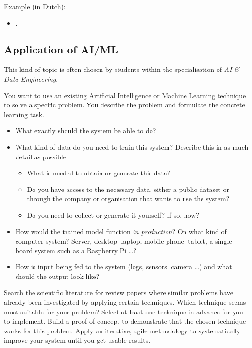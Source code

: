Example (in Dutch):

\begin{itemize}
	\item {} \autocite{Vermeersch2024}.
\end{itemize}

\subsection{Application of AI/ML}%
\label{ssec:thesis_type_application_of_AI_ML}

This kind of topic is often chosen by students within the specialisation of \emph{AI \& Data Engineering}.

You want to use an existing Artificial Intelligence or Machine Learning technique to solve a specific problem. You describe the problem and formulate the concrete learning task. 
\begin{itemize}
	\item What exactly should the system be able to do?
	\item What kind of data do you need to train this system? Describe this in as much detail as possible!
	\begin{itemize}
		\item What is needed to obtain or generate this data? 
		\item Do you have access to the necessary data, either a public dataset or through the company or organisation that wants to use the system?
		\item Do you need to collect or generate it yourself? If so, how? 
	\end{itemize}
	\item How would the trained model function \textit{in production}? On what kind of computer system? Server, desktop, laptop, mobile phone, tablet, a single board system such as a Raspberry Pi {\ldots}?
	\item How is input being fed to the system (logs, sensors, camera {\ldots}) and what should the output look like?
\end{itemize} 


Search the scientific literature for review papers where similar problems have already been investigated by applying certain techniques. Which technique seems most suitable for your problem? Select at least one technique in advance for you to implement. Build a proof-of-concept to demonstrate that the chosen technique works for this problem. Apply an iterative, agile methodology to systematically improve your system until you get usable results.

